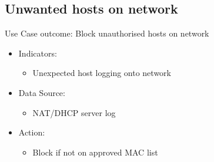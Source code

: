 \documentclass[
	letterpaper, %
	10pt, %
	unnumberedsections, %
	twoside, %
]{APAAssignment}
\begin{document}
\subsection{Unwanted hosts on network}
Use Case outcome: Block unauthorised hosts on network
\begin{spacing}{1}
	\begin{itemize}
		\item Indicators:
		      \begin{itemize}
			      \item Unexpected host logging onto network
		      \end{itemize}
		\item Data Source:
		      \begin{itemize}
			      \item NAT/DHCP server log
		      \end{itemize}
		\item Action:
		      \begin{itemize}
			      \item Block if not on approved MAC list
		      \end{itemize}
	\end{itemize}
\end{spacing}
\end{document}
